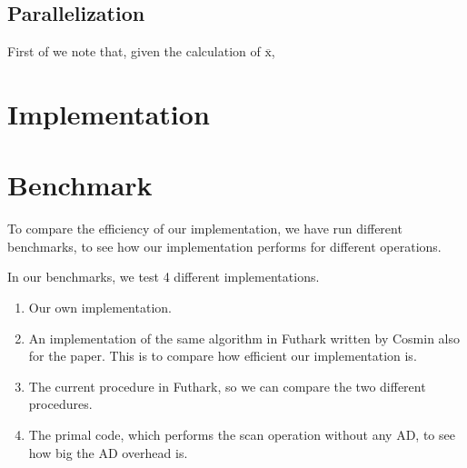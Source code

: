 \documentclass{article}
\newcommand{\xo}{\overline{\text{x}}}
\begin{document}
\subsection{Parallelization}
First of we note that,
given the calculation of \(\xo\),

\section{Implementation}
\section{Benchmark}
To compare the efficiency of our implementation,
we have run different benchmarks,
to see how our implementation performs for different operations.

In our benchmarks, we test 4 different implementations.
\begin{enumerate}

	\item Our own implementation.
	\item An implementation of the same algorithm in Futhark written by Cosmin
	      also for the \cite{Futhark} paper.
	      This is to compare how efficient our implementation is.
	\item The current procedure in Futhark, so we can compare the two
	      different procedures.
	\item The primal code, which performs the scan operation without any AD,
	      to see how big the AD overhead is.

\end{enumerate}
\end{document}
